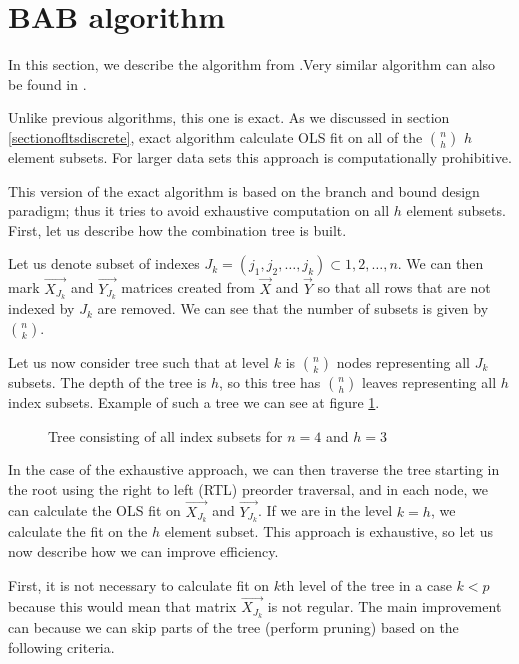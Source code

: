 \section{BAB algorithm} \label{sectionbab}
In this section, we describe the algorithm from \cite{agullo2001new}.Very similar algorithm can also be found in \cite{hofmann2010matrix}.

Unlike previous algorithms, this one is exact. As we discussed in section \ref{sectionofltsdiscrete}, exact algorithm calculate OLS fit on all of the $\binom{n}{h}$ $h$ element subsets. For larger data sets this approach is computationally prohibitive.

This version of the exact algorithm is based on the branch and bound design paradigm; thus it tries to avoid exhaustive computation on all $h$ element subsets. First, let us describe how the combination tree is built. 

Let us denote subset of indexes 
$J_k = (j_1, j_2, \ldots , j_k) \subset {1,2,\ldots , n}$. We can then mark
$\vec{ X_{J_k} }$ and $\vec{ Y_{J_k} }$ matrices created from $\vec{X}$
and $\vec{Y}$ so that all rows that are not indexed by $J_k$ are removed.
We can see that the number of subsets is given by $\binom{n}{k}$.

Let us now consider tree such that at level $k$ is $\binom{n}{k}$ nodes representing all $J_k$ subsets. The depth of the tree is $h$, so this tree has $\binom{n}{h}$ leaves representing all $h$ index subsets. Example of such a tree we can see at figure \ref{figure:full:tree}.

\begin{figure}[h]
\centering
{}
\caption{Tree consisting of all index subsets for $n=4$ and $h=3$}
\label{figure:full:tree}
\end{figure}

In the case of the exhaustive approach, we can then traverse the tree starting in the root using the right to left (RTL) preorder traversal, and in each node, we can calculate the OLS fit on $\vec{ X_{J_k} }$ and $\vec{ Y_{J_k} }$. If we are in the level $k = h$, we calculate the fit on the $h$ element subset. This approach is exhaustive, so let us now describe how we can improve efficiency. 

First, it is not necessary to calculate fit on $k$th level of the tree in a case $k < p$ because this would mean that matrix $\vec{ X_{J_k} }$ is not regular. The main improvement can because we can skip parts of the tree (perform pruning) based on the following criteria. 

